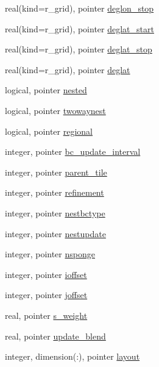 \begin{DoxyCompactItemize}
real(kind=r\-\_\-grid), pointer \hyperlink{classfv__control__mod_ab666fb8d3f5d8126bd9e756907e613e1}{deglon\-\_\-stop}
\item 
real(kind=r\-\_\-grid), pointer \hyperlink{classfv__control__mod_a3115a067b4b068522b933e2cc3e561e9}{deglat\-\_\-start}
\item 
real(kind=r\-\_\-grid), pointer \hyperlink{classfv__control__mod_ab6ff7a8ad9c9efb237e38ee764aeebed}{deglat\-\_\-stop}
\item 
real(kind=r\-\_\-grid), pointer \hyperlink{classfv__control__mod_ac023f3c9fe559dbcf7206c9e95365adf}{deglat}
\item 
logical, pointer \hyperlink{classfv__control__mod_a888c427a6af3ddf02bd3cfa499735161}{nested}
\item 
logical, pointer \hyperlink{classfv__control__mod_ac3aa92c051cecb429cfe4459f0bc20ec}{twowaynest}
\item 
logical, pointer \hyperlink{classfv__control__mod_a2c117981e3eaaa04ed8665dc676cae1a}{regional}
\item 
integer, pointer \hyperlink{classfv__control__mod_a0b129755b56cb9d70a929b5d46ea0384}{bc\-\_\-update\-\_\-interval}
\item 
integer, pointer \hyperlink{classfv__control__mod_aa8414caeda62e3b0d0323b5651dc6ceb}{parent\-\_\-tile}
\item 
integer, pointer \hyperlink{classfv__control__mod_a1ea5ca193a308c6557a1d51c1cd78e5c}{refinement}
\item 
integer, pointer \hyperlink{classfv__control__mod_a8501bcfc790a38b595fe96fdbf094dcc}{nestbctype}
\item 
integer, pointer \hyperlink{classfv__control__mod_aa2a2e8daf4ef4127a85ff187f6bdb44a}{nestupdate}
\item 
integer, pointer \hyperlink{classfv__control__mod_ad64bda37c9167de57eb5c08e1cd21588}{nsponge}
\item 
integer, pointer \hyperlink{classfv__control__mod_a931b77a75c5dcd01595b45112bae9638}{ioffset}
\item 
integer, pointer \hyperlink{classfv__control__mod_a9ff9b60e60c1a2f85df3abf9ade7d57d}{joffset}
\item 
real, pointer \hyperlink{classfv__control__mod_a84710a8f70995d6c5c2436471f516d19}{s\-\_\-weight}
\item 
real, pointer \hyperlink{classfv__control__mod_adc0d08b31c495fc6b3e272b90b654a98}{update\-\_\-blend}
\item 
integer, dimension(\-:), pointer \hyperlink{classfv__control__mod_afe243c14856ffd8377a4cfb0b5f14e84}{layout}

\end{DoxyCompactItemize}

